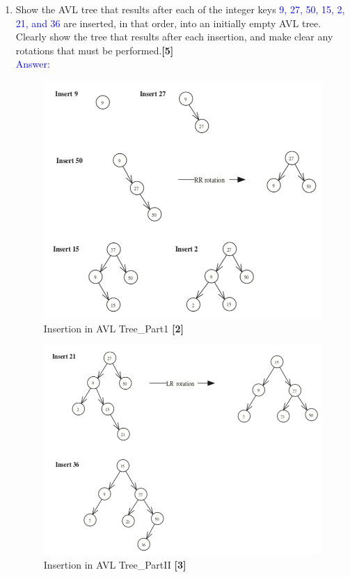 \documentclass[12pt ,a4paper]{exam}
\begin{document}
\begin{enumerate}[start=1,label={\bfseries Q\arabic*)}]
\begin{itemize}
	\end{itemize}
	\item Show the AVL tree that results after each of the integer keys\textcolor{blue}{ 9, 27, 50, 15, 2, 21, and 36} are inserted, in that order, into an initially empty AVL tree. Clearly show the tree that results after each insertion, and make clear any rotations that must be performed.\hfill\textbf{[5]} \\
	\textcolor{blue}{Answer: } 
	\begin{figure}[h]
		\centering
		\includegraphics[width=0.8\linewidth]{"Screenshot 2020-12-27 at 12.58.52 PM"}
		\caption{Insertion in AVL Tree\_Part1 \hfill\textbf{[2]} }
		\label{fig:screenshot-2020-12-27-at-12}
	\end{figure}
	\begin{figure}[h]
		\centering
		\includegraphics[width=0.8\linewidth]{"Screenshot 2020-12-27 at 12.59.03 PM"}
		\caption{Insertion in AVL Tree\_PartII \hfill\textbf{[3]} }

\end{figure}
\end{enumerate}
\end{document}
